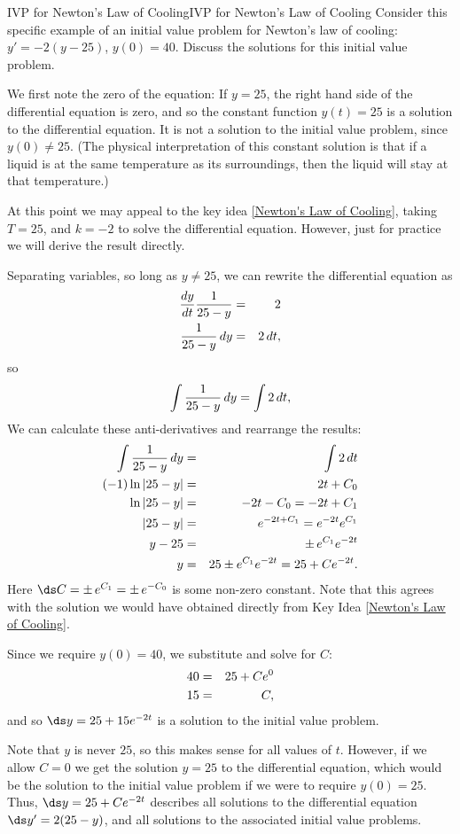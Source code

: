 \begin{example}{IVP for Newton's Law of Cooling}{IVP for Newton's Law of Cooling}\label{IVP for Newton's Law of Cooling}
 Consider this specific example of an initial value problem
for Newton's law of cooling: $y' = -2(y-25)$, $y(0)=40$.
Discuss the solutions for this initial value problem.
\end{example}

\begin{solution}
We first note the zero of the equation: If $y = 25$, the right hand side of the differential
equation is zero, and so the constant function $y(t)=25$ is a solution
to the differential equation. It is not a solution to the initial
value problem, since $y(0)\neq 25$.  (The physical interpretation of
this constant solution is that if a liquid is at the same temperature
as its surroundings, then the liquid will stay at that temperature.)

At this point we may appeal to the key idea \ref{Newton's Law of Cooling}, taking $ T=25 $, and $ k=-2 $ to solve the differential equation.  However, just for practice we will derive the result directly. 

Separating variables, so long as $y\ne 25$,  we can rewrite the differential equation as
\begin{eqnarray*}
{dy\over dt}{1\over 25-y}&=&2\cr
{1\over 25-y}\,dy&=&2\,dt,
\end{eqnarray*}
so 
$$\int {1\over 25-y}\,dy = \int 2\,dt,$$
We can calculate these anti-derivatives and 
rearrange the results:
\begin{eqnarray*}
\int {1\over 25-y}\,dy &=& \int 2\,dt\cr
(-1)\ln|25-y| &=& 2t+C_0\cr
\ln|25-y| &=& -2t - C_0 = -2t + C_1\cr
|25-y| &=& e^{-2t+C_1}=e^{-2t} e^{C_1}\cr
y-25 &=& \pm\, e^{C_1} e^{-2t} \cr
y &=& 25 \pm e^{C_1} e^{-2t} =25+Ce^{-2t}.
\end{eqnarray*}
Here $\ds C = \pm\, e^{C_1} = \pm\, e^{-C_0}$ 
is some non-zero constant. Note that this agrees with the solution we would have obtained directly from Key Idea \ref{Newton's Law of Cooling}.

Since we require $y(0)=40$, we substitute and solve for $C$:
\begin{eqnarray*}
40&=&25+Ce^0\cr
15&=&C,
\end{eqnarray*}
and so $\ds y=25+15 e^{-2t}$ is a solution to the initial value
problem. 

Note that $y$ is never $ 25 $, so this makes sense for all values
of $t$. However, if we allow $C=0$ we get the solution
$y=25$ to the differential equation, which would be the solution to
the initial value problem if we were to require $y(0)=25$. Thus, 
$\ds y=25+Ce^{-2t}$ describes all solutions to the differential
equation $\ds y' = 2(25-y)$, and all solutions to the associated
initial value problems. 
\end{solution}


